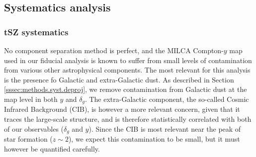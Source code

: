 \documentclass[useAMS,usenatbib]{mn2e}
\begin{document}
  \subsection{Systematics analysis}\label{ssec:results.syst}
    \subsubsection{tSZ systematics}\label{sssec:results.syst.y}
      No component separation method is perfect, and the MILCA Compton-$y$ map used in our fiducial analysis is known to suffer from small levels of contamination from various other astrophysical components. The most relevant for this analysis is the presence fo Galactic and extra-Galactic dust. As described in Section \ref{sssec:methods.syst.deproj}, we remove contamination from Galactic dust at the map level in both $y$ and $\delta_g$. The extra-Galactic component, the so-called Cosmic Infrared Background (CIB), is however a more relevant concern, given that it traces the large-scale structure, and is therefore statistically correlated with both of our observables ($\delta_g$ and $y$). Since the CIB is most relevant near the peak of star formation ($z\sim2$), we expect this contamination to be small, but it must however be quantified carefully.
      
\end{document}
